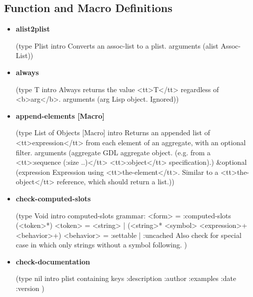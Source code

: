 \documentclass [11pt]{book}
\begin{document}
\subsection{Function and Macro Definitions}

\label{subsec:functionandmacrodefinitions}



\begin{itemize}

\item {}
\label{prim:alist2plist}
\textbf{alist2plist}

(type Plist intro  Converts an assoc-list to a plist.
 arguments (alist Assoc-List))



\item {}
\label{prim:always}
\textbf{always}

(type T intro
  Always returns the value <tt>T</tt> regardless of <b>arg</b>.
 arguments (arg Lisp object. Ignored))



\item {}
\label{prim:append-elements}
\textbf{append-elements [Macro]}

(type List of Objects [Macro] intro
  Returns an appended list of <tt>expression</tt> from each element of an aggregate,
with an optional filter.
 arguments
 (aggregate
  GDL aggregate object. (e.g. from a <tt>:sequence (:size ..)</tt> <tt>:object</tt> specification).)
 \&optional
 (expression
  Expression using <tt>the-element</tt>. Similar to a <tt>the-object</tt> reference, which should return a list.))



\item {}
\label{prim:check-computed-slots}
\textbf{check-computed-slots}

(type Void intro  computed-slots grammar: 
<form>     = :computed-slots (<token>*)
<token>    = <string> | (<string>* <symbol> <expression>+ <behavior>+)
<behavior> = :settable | :uncached
Also check for special case in which only strings without a symbol following.
)



\item {}
\label{prim:check-documentation}
\textbf{check-documentation}

(type nil intro
 plist containing keys :description :author :examples :date :version
)




\end{itemize}
\end{document}

